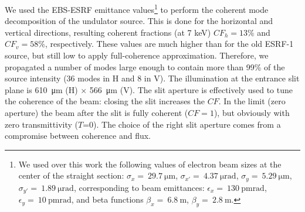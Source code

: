 \documentclass[9pt,twocolumn,twoside]{osajnl}
\begin{document}
We used the EBS-ESRF emittance values\footnote{We used over this work the following values of electron beam sizes at the center of the straight section: $\sigma_x=~\SI{29.7}{\micro\meter}$,
$\sigma_{x'}=~\SI{4.37}{\micro\radian}$,
$\sigma_y=~\SI{5.29}{\micro\meter}$,
$\sigma_{y'}=~\SI{1.89}{\micro\radian}$, corresponding to beam emittances:  $\epsilon_x=~\SI{130}{\pico\meter \radian}$,
$\epsilon_y=~\SI{10}{\pico\meter \radian}$, and beta functions
$\beta_x=~\SI{6.8}{\meter}$,
$\beta_y=~\SI{2.8}{\meter}$.
}
to perform the coherent mode decomposition of the undulator source.
This is done for the horizontal and vertical directions, resulting coherent fractions (at 7 keV) $CF_h=13\%$ and $CF_v=58\%$, respectively. These values are much higher than for the old ESRF-1 source, but still low to apply full-coherence approximation. Therefore, we propagated a number of modes large enough to contain more than 99\% of the source intensity (36 modes in H and 8 in V). The illumination at the entrance slit plane is \SI{610}{\micro\meter} (H) $\times$ \SI{566}{\micro\meter} (V). The slit aperture is effectively used to tune the coherence of the beam: closing the slit increases the $CF$. In the limit (zero aperture) the beam after the slit is fully coherent ($CF=1$), but obviously with zero transmittivity ($T$=0). The choice of the right slit aperture comes from a compromise between coherence and flux.  

\end{document}
